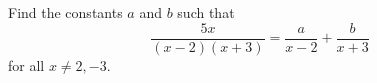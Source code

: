 Find the constants $a$ and $b$ such that
\[
\dfrac{5x}{(x-2)(x+3)}=\dfrac{a}{x-2}+\dfrac{b}{x+3}
\]
for all $x\ne2,-3$.
